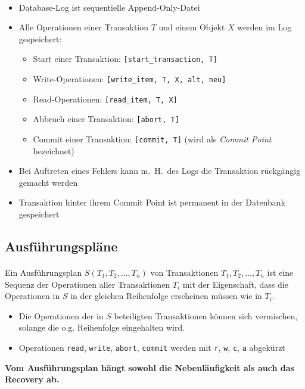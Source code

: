 \begin{frame}{\insertsection}
	\framesubtitle{\insertsubsection}
\begin{itemize}
\item Database-Log ist sequentielle Append-Only-Datei
\pause
\item Alle Operationen einer Transaktion $T$ und einem Objekt $X$ werden im Log gespeichert: 
\begin{itemize}
\item Start einer Transaktion: \texttt{[start\_transaction, T]}
\item Write-Operationen: \texttt{[write\_item, T, X, alt, neu]}
\item Read-Operationen: \texttt{[read\_item, T, X]} 
\item Abbruch einer Transaktion: \texttt{[abort, T]}
\item Commit einer Transaktion: \texttt{[commit, T]} (wird als \textit{Commit Point} bezeichnet)
\end{itemize}
\pause
\item Bei Auftreten eines Fehlers kann m.~H.~des Logs die Transaktion rückgängig gemacht werden
\pause
\item Transaktion hinter ihrem Commit Point ist permanent in der Datenbank gespeichert
\end{itemize} 
\end{frame}

\subsection{Ausführungspläne}

\begin{frame}{\insertsection}
\framesubtitle{\insertsubsection}
\begin{definition}
Ein Ausführungsplan $S(T_1,T_2,\dots ,T_n)$ von Transaktionen $T_1,T_2,\dots ,T_n$ ist eine Sequenz der 
Operationen aller Transaktionen $T_i$ mit der Eigenschaft, dass die Operationen in $S$ in der gleichen 
Reihenfolge erscheinen müssen wie in $T_i$. 
\end{definition}
\begin{itemize}
\item Die Operationen der in $S$ beteiligten Transaktionen können sich vermischen, solange die o.g. Reihenfolge eingehalten wird.
\item Operationen \texttt{read}, \texttt{write}, \texttt{abort}, \texttt{commit} werden mit \texttt{r}, \texttt{w}, 
\texttt{c}, \texttt{a} abgekürzt
\end{itemize}
\abs
\textbf{Vom Ausführungsplan hängt sowohl die Nebenläufigkeit als auch das Recovery ab.}
\end{frame}

